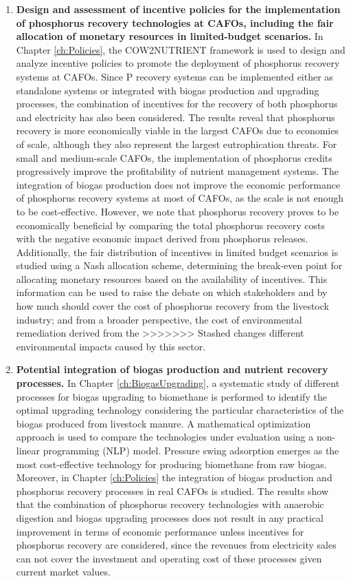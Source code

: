\begin{enumerate}[font=\bfseries]
	\item \textbf{Design and assessment of incentive policies for the implementation of phosphorus recovery technologies at CAFOs, including the fair allocation of monetary resources in limited-budget scenarios.} In Chapter \ref{ch:Policies}, the COW2NUTRIENT framework is used to design and analyze incentive policies to promote the deployment of phosphorus recovery systems at CAFOs. Since P recovery systems can be implemented either as standalone systems or integrated with biogas production and upgrading processes, the combination of incentives for the recovery	of both phosphorus and electricity has also been considered. The results reveal that phosphorus recovery is more economically viable in the largest CAFOs due to economies of scale, although they also represent the largest eutrophication threats. For small and medium-scale CAFOs, the implementation of phosphorus credits progressively improve the	profitability of nutrient management systems. The integration of biogas production does not improve the economic performance of phosphorus recovery systems at most of CAFOs, as the scale is not enough to be cost-effective. However, we note that phosphorus recovery proves to be economically beneficial by comparing the total phosphorus recovery costs with the negative economic impact derived from phosphorus releases. Additionally, the fair distribution of incentives in limited budget scenarios is studied using a Nash allocation scheme, determining the break-even point for allocating monetary resources based on the availability of incentives. This information can be used to raise the debate on which stakeholders and by how much should cover the cost of phosphorus recovery from the livestock industry; and from a broader perspective, the cost of environmental remediation derived from the
>>>>>>> Stashed changes
	different environmental impacts caused by this sector.
	
	\item \textbf{Potential integration of biogas production and nutrient recovery processes.} In Chapter \ref{ch:BiogasUpgrading}, a systematic study of different processes for biogas upgrading to biomethane is performed to identify the optimal upgrading technology considering the particular characteristics of the biogas produced from livestock manure. A mathematical optimization approach is used to compare the technologies under evaluation using a non-linear programming (NLP) model. Pressure swing adsorption emerges as the most cost-effective technology for producing biomethane from raw biogas. Moreover, in Chapter \ref{ch:Policies} the integration of biogas production and phosphorus recovery processes in real CAFOs is studied. The results show that the combination of phosphorus recovery technologies with anaerobic digestion and biogas upgrading processes does not result in any practical improvement in terms of economic performance unless incentives for 	phosphorus recovery are considered, since the revenues from electricity sales can not cover the investment and operating cost of these processes given current market values.
\end{enumerate}


